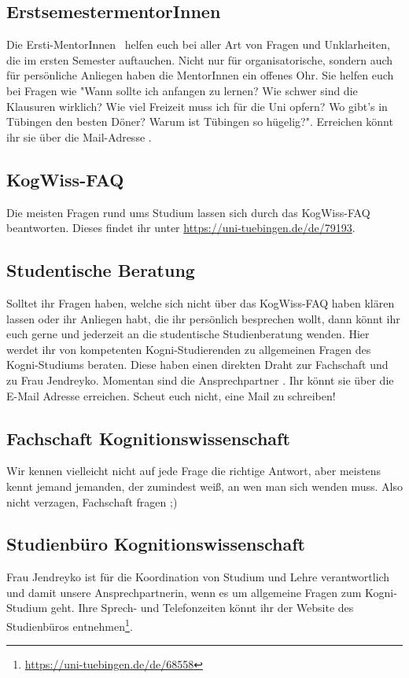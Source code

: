\subsection*{ErstsemestermentorInnen}
Die Ersti-MentorInnen \kognimentoren ~helfen euch bei aller Art von Fragen und Unklarheiten, die im ersten Semester auftauchen. Nicht nur für organisatorische, sondern auch für persönliche Anliegen haben die MentorInnen ein offenes Ohr. Sie helfen euch bei Fragen wie "Wann sollte ich anfangen zu lernen? Wie schwer sind die Klausuren wirklich? Wie viel Freizeit muss ich für die Uni opfern? Wo gibt's in Tübingen den besten Döner? Warum ist Tübingen so hügelig?". Erreichen könnt ihr sie über die Mail-Adresse . 

\subsection*{KogWiss-FAQ}
Die meisten Fragen rund ums Studium lassen sich durch das KogWiss-FAQ beantworten. Dieses findet ihr unter \url{https://uni-tuebingen.de/de/79193}.	%

\subsection*{Studentische Beratung}
Solltet ihr Fragen haben, welche sich nicht über das KogWiss-FAQ haben klären lassen oder ihr Anliegen habt, die ihr persönlich besprechen wollt, dann könnt ihr euch gerne und jederzeit an die studentische Studienberatung wenden. Hier werdet ihr von kompetenten Kogni-Studierenden zu allgemeinen Fragen des Kogni-Studiums beraten. Diese haben einen direkten Draht zur Fachschaft und zu Frau Jendreyko.  Momentan sind die Ansprechpartner \studBeratung. Ihr könnt sie über die E-Mail Adresse  erreichen. Scheut euch nicht, eine Mail zu schreiben!

\subsection*{Fachschaft Kognitionswissenschaft}
Wir kennen vielleicht nicht auf jede Frage die richtige Antwort, aber meistens kennt jemand jemanden, der zumindest weiß, an wen man sich wenden muss. Also nicht verzagen, Fachschaft fragen ;)

\subsection*{Studienbüro Kognitionswissenschaft}
Frau Jendreyko ist für die Koordination von Studium und Lehre verantwortlich und damit unsere Ansprechpartnerin, wenn es um allgemeine Fragen zum Kogni-Studium geht. Ihre Sprech- und Telefonzeiten könnt ihr der Website des Studienbüros entnehmen\footnote{\url{https://uni-tuebingen.de/de/68558}}.

